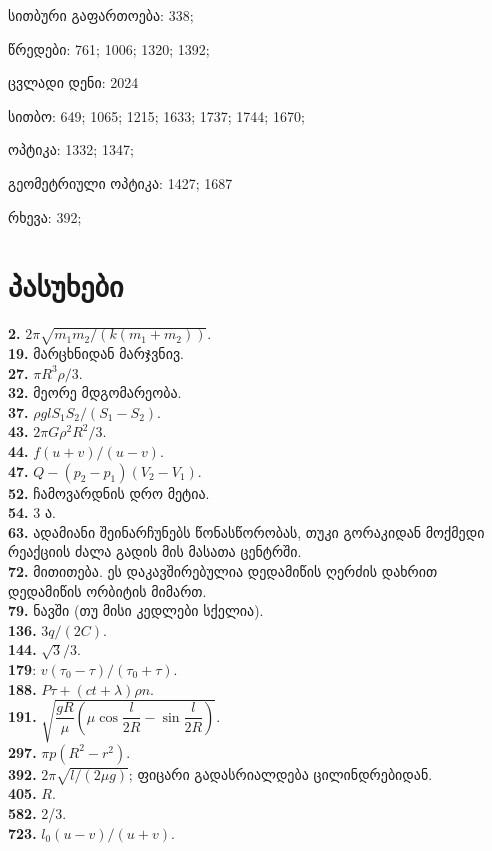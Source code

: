 \documentclass[12pt,a4paper,]{report}
\begin{document}
სითბური გაფართოება: 338;

წრედები: 761; 1006; 1320; 1392;

ცვლადი დენი: 2024

სითბო: 649; 1065; 1215; 1633; 1737; 1744; 1670;

ოპტიკა: 1332; 1347;

გეომეტრიული ოპტიკა: 1427; 1687

რხევა: 392;

\chapter{პასუხები}
\textbf{2.} $2\pi\sqrt{m_1 m_2 / (k(m_1 + m_2))}$. \\
\textbf{19.} მარცხნიდან მარჯვნივ. \\
\textbf{27.} $\pi R^3 \rho /3$. \\
\textbf{32.} მეორე მდგომარეობა. \\
\textbf{37.} $\rho glS_1S_2/(S_1-S_2)$. \\
\textbf{43.} $2\pi G\rho^2R^2/3.$ \\
\textbf{44.} $f(u + v)/(u - v)$. \\
\textbf{47.} $Q - (p_2 - p_1)(V_2 - V_1)$. \\
\textbf{52.} ჩამოვარდნის დრო მეტია. \\
\textbf{54.} 3 ა. \\
\textbf{63.} ადამიანი შეინარჩუნებს წონასწორობას, თუკი გორაკიდან მოქმედი რეაქციის ძალა გადის მის მასათა ცენტრში. \\
\textbf{72.} მითითება. ეს დაკავშირებულია დედამიწის ღერძის დახრით დედამიწის ორბიტის მიმართ. \\
\textbf{79.} ნავში (თუ მისი კედლები სქელია). \\
\textbf{136.} $3q/(2C)$. \\
\textbf{144.} $\sqrt{3}/3$. \\ 
\textbf{179}: $v(\tau_0-\tau)/(\tau_0+\tau)$. \\
\textbf{188.} $P\tau+(ct+\lambda)\rho n$. \\
\textbf{191.} $\sqrt{\dfrac{gR}{\mu}\left(\mu\cos{\dfrac{l}{2R}} - \sin{\dfrac{l}{2R}}\right)}.$ \\
\textbf{297.} $\pi p(R^2-r^2)$. \\
\textbf{392.} $2\pi\sqrt{l/(2\mu g)}$; ფიცარი გადასრიალდება ცილინდრებიდან. \\
\textbf{405.} $R$. \\
\textbf{582.} 2/3. \\
\textbf{723.} $l_0(u-v)/(u+v)$. \\
\end{document}

